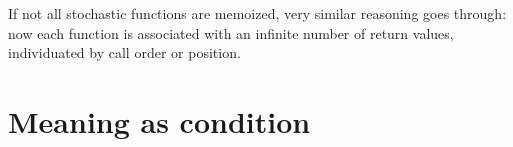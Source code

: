 \documentclass[pdfextras]{handbook}
\begin{document}
If not all stochastic functions are memoized, very similar reasoning goes through: now each function is associated with an infinite number of return values, individuated by call order or position.




 
 
 
 
 
 
 
 
\section{Meaning as condition}
\label{literal}
\label{literal-listener}
\end{document}
